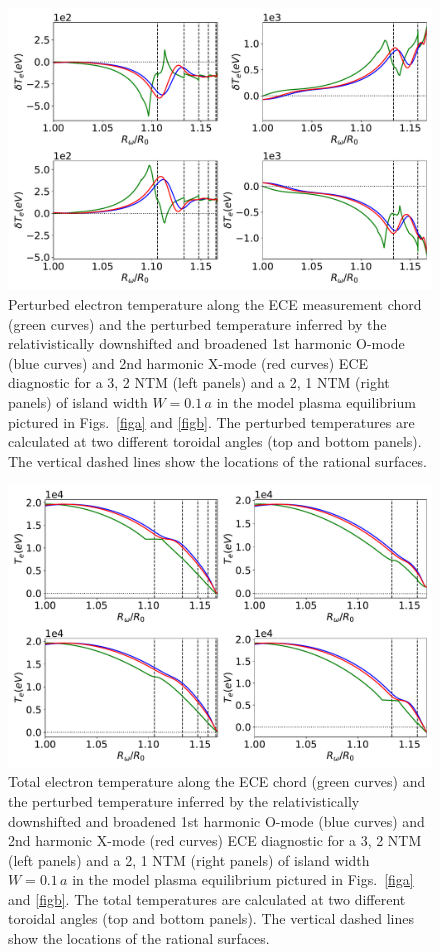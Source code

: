 \documentclass{iopjournal}
\begin{document}
{\begin{figure}
\centerline{\includegraphics[width=\textwidth]{Fig16.pdf}}
\caption{Perturbed electron temperature along the ECE measurement chord (green curves) and the perturbed temperature inferred by the relativistically downshifted and  broadened 1st harmonic
O-mode (blue curves) and 2nd harmonic X-mode (red curves) ECE diagnostic for a
3, 2 NTM (left panels) and a 2, 1 NTM (right panels) of island width $W=0.1\,a$ in the model plasma equilibrium pictured in Figs.~\ref{figa} and \ref{figb}.
The perturbed temperatures are calculated  at two different toroidal angles (top and bottom panels). 
The vertical dashed lines show the locations of the rational surfaces. 
\label{fig16}}
\end{figure}

\begin{figure}
\centerline{\includegraphics[width=\textwidth]{Fig17.pdf}}
\caption{Total electron temperature along the ECE chord (green curves) and the perturbed temperature inferred by the relativistically downshifted and broadened 
 1st harmonic
O-mode (blue curves) and 2nd harmonic X-mode (red curves) ECE diagnostic  for a
3, 2 NTM (left panels) and a 2, 1 NTM (right panels) of island width $W=0.1\,a$  in the model plasma equilibrium pictured in Figs.~\ref{figa} and \ref{figb}.
The total temperatures are calculated  at two different toroidal angles (top and bottom panels).  The vertical dashed lines show the locations of the rational surfaces. \label{fig17}}
\end{figure}

}
\end{document}
